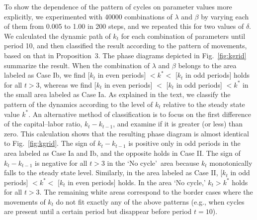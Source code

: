 \documentclass[nogrid]{MBE}%
\begin{document}
{%

To show the dependence of the pattern of cycles on parameter values more explicitly, we
experimented with 40000 combinations of $\lambda$ and $\beta$ by varying each of them from 0.005
to 1.00 in 200 steps, and we repeated this for two values of $\delta$. We calculated the dynamic
path of $k_{t}$ for each combination of parameters until period 10, and then classified the result
according to the pattern of movements, based on that in Proposition~3. The phase diagrams depicted
in Fig.\ \ref{fig:kgrid} summarize the result. When the combination of $\lambda$ and $\beta$
belongs to the area labeled as Case Ib, we find [$k_{t}$ in even periods] $<k^{\ast}<$ [$k_{t}$ in
odd periods] holds for all $t>3$, whereas we find [$k_{t}$ in even periods] $<$ [$k_{t}$ in odd
periods] $<k^{\ast}$ in the small area labeled as Case Ia. {As explained in the text, we classify
the pattern of the dynamics according to the level of $k_{t}$ relative to the steady state value
$k^{\ast}$. An alternative method of classification is to focus on the first difference of the
capital--labor ratio, $k_{t}-k_{t-1}$, and examine if it is greater (or less) than zero. This
calculation shows that the resulting phase diagram is almost identical to Fig.\ \ref{fig:kgrid}.
The sign of $k_{t}-k_{t-1}$ is positive only in odd periods in the area labeled as Case Ia and Ib,
and the opposite holds in Case II. The sign of $k_{t}-k_{t-1}$ is negative for all $t>3$ in the
`No cycle'\ area because $k_{t}$ monotonically falls to the steady state level.} Similarly, in the
area labeled as Case II, [$k_{t}$ in odd periods] $<k^{\ast}<$ [$k_{t}$ in even periods] holds. In
the area `No cycle,' $k_{t}>k^{\ast}$ holds for all $t>3$. The remaining white areas correspond to
the border cases where the movements of $k_{t}$ do not fit exactly any of the above patterns
(e.g., when cycles are present until a certain period but disappear before period $t=10$).

}
\end{document}

